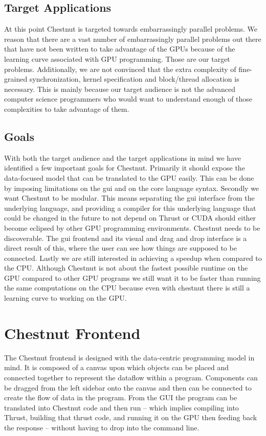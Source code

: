 \documentclass[twocolumn]{article}
\renewcommand{\|}{\origbar} %
\begin{document}
\subsection{Target Applications}

At this point Chestnut is targeted towards embarrassingly parallel problems. We reason that there are a vast number of embarrassingly parallel problems out there that have not been written to take advantage of the GPUs because of the learning curve associated with GPU programming. Those are our target problems. Additionally, we are not convinced that the extra complexity of fine-grained synchronization, kernel specification and block/thread allocation is necessary. This is mainly because our target audience is not the advanced computer science programmers who would want to understand enough of those complexities to take advantage of them.

\subsection{Goals}

With both the target audience and the target applications in mind we have identified a few important goals for Chestnut. Primarily it should expose the data-focused model that can be translated to the GPU easily. This can be done by imposing limitations on the gui and on the core language syntax. Secondly we want Chestnut to be modular. This means separating the gui interface from the underlying language, and providing a compiler for this underlying language that could be changed in the future to not depend on Thrust or CUDA should either become eclipsed by other GPU programming environments. Chestnut needs to be discoverable. The gui frontend and its visual and drag and drop interface is a direct result of this, where the user can see how things are supposed to be connected. Lastly we are still interested in achieving a speedup when compared to the CPU. Although Chestnut is not about the fastest possible runtime on the GPU compared to other GPU programs we still want it to be faster than running the same computations on the CPU because even with chestnut there is still a learning curve to working on the GPU.

\section{Chestnut Frontend}
\label{sec:chestnutFrontend}

The Chestnut frontend is designed with the data-centric programming model in mind. It is composed of a canvas upon which objects can be placed and connected together to represent the dataflow within a program. Components can be dragged from the left sidebar onto the canvas and then can be connected to create the flow of data in the program. From the GUI the program can be translated into Chestnut code and then run -- which implies compiling into Thrust, building that thrust code, and running it on the GPU then feeding back the response -- without having to drop into the command line.
\end{document}
